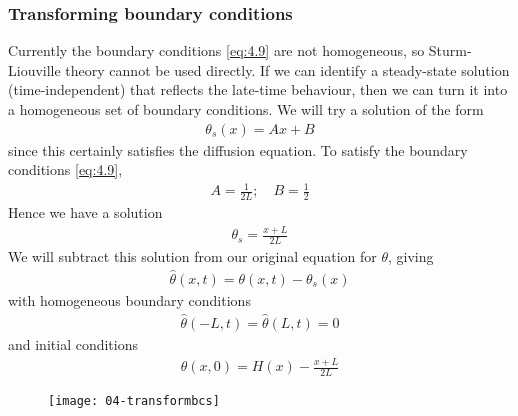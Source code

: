 \subsubsection{Transforming boundary conditions}
Currently the boundary conditions \cref{eq:4.9} are not homogeneous, so Sturm-Liouville theory cannot be used directly.
If we can identify a steady-state solution (time-independent) that reflects the late-time behaviour, then we can turn it into a homogeneous set of boundary conditions.
We will try a solution of the form
\begin{align*}
	\theta_s(x) = Ax + B
\end{align*}
since this certainly satisfies the diffusion equation.
To satisfy the boundary conditions \cref{eq:4.9},
\begin{align*}
	A = \frac{1}{2L};\quad B = \frac{1}{2}
\end{align*}
Hence we have a solution
\begin{align} \label{eq:4.10}
	\theta_s = \frac{x + L}{2L}
\end{align}
We will subtract this solution from our original equation for $\theta$, giving
\begin{align*}
	\hat \theta(x,t) = \theta(x,t) - \theta_s(x)
\end{align*}
with homogeneous boundary conditions
\begin{align*}
	\hat \theta(-L, t) = \hat \theta(L, t) = 0
\end{align*}
and initial conditions
\begin{align} \label{eq:4.11}
	\hat \theta(x,0) = H(x) - \frac{x+L}{2L}
\end{align}

\begin{figure}[h] 
    \centering 
    \texttt{[image: 04-transformbcs]} 
\end{figure}

